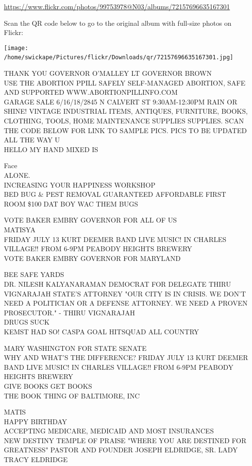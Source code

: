\documentclass[10pt,letterpaper]{article}
\begin{document}
\url{https://www.flickr.com/photos/99753978@N03/albums/72157696635167301}

Scan the QR code below to go to the original album with full-size photos on Flickr:

\texttt{[image: /home/swickape/Pictures/flickr/Downloads/qr/72157696635167301.jpg]}
\

THANK YOU GOVERNOR O'MALLEY LT GOVERNOR BROWN\\
USE THE ABORTION PPILL SAFELY SELF{-}MANAGED ABORTION, SAFE AND SUPPORTED WWW.ABORTIONPILLINFO.COM\\
GARAGE SALE 6/16/18/2845 N CALVERT ST 9:30AM{-}12:30PM RAIN OR SHINE!  VINTAGE INDUSTRIAL ITEMS, ANTIQUES, FURNITURE, BOOKS, CLOTHING, TOOLS, HOME MAINTENANCE SUPPLIES SUPPLIES.  SCAN THE CODE BELOW FOR LINK TO SAMPLE PICS.  PICS TO BE UPDATED ALL THE WAY U\\
HELLO MY HAND MIXED IS

Face\\
ALONE.\\
INCREASING YOUR HAPPINESS WORKSHOP\\
BED BUG \& PEST REMOVAL GUARANTEED AFFORDABLE FIRST ROOM \$100 DAT BOY WAC THEM BUGS

VOTE BAKER EMBRY GOVERNOR FOR ALL OF US\\
MATISYA\\
FRIDAY JULY 13 KURT DEEMER BAND LIVE MUSIC!  IN CHARLES VILLAGE!!  FROM 6{-}9PM PEABODY HEIGHTS BREWERY\\
VOTE BAKER EMBRY GOVERNOR FOR MARYLAND

BEE SAFE YARDS\\
DR. NILESH KALYANARAMAN DEMOCRAT FOR DELEGATE THIRU VIGNARAJAH STATE'S ATTORNEY "OUR CITY IS IN CRISIS.  WE DON'T NEED A POLITICIAN OR A DEFENSE ATTORNEY.  WE NEED A PROVEN PROSECUTOR." {-} THIRU VIGNARAJAH\\
DRUGS SUCK\\
KEMST HAD SO!  CASPA GOAL HITSQUAD ALL COUNTRY

MARY WASHINGTON FOR STATE SENATE\\
WHY AND WHAT'S THE DIFFERENCE?  FRIDAY JULY 13 KURT DEEMER BAND LIVE MUSIC!  IN CHARLES VILLAGE!!  FROM 6{-}9PM PEABODY HEIGHTS BREWERY\\
GIVE BOOKS GET BOOKS\\
THE BOOK THING OF BALTIMORE, INC

MATIS\\
HAPPY BIRTHDAY\\
ACCEPTING MEDICARE, MEDICAID AND MOST INSURANCES\\
NEW DESTINY TEMPLE OF PRAISE "WHERE YOU ARE DESTINED FOR GREATNESS"  PASTOR AND FOUNDER JOSEPH ELDRIDGE, SR.  LADY TRACY ELDRIDGE
\end{document}
